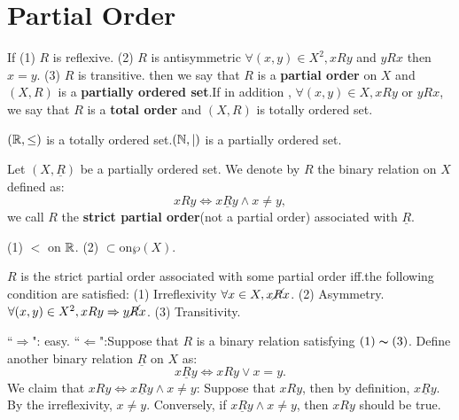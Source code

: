 \section{Partial Order}
\begin{definitionenv}
    If 
    \newline
    (1) $R$ is reflexive.
    \newline
    (2) $R$ is antisymmetric $\forall (x, y)\in X^2, xRy $ and $yRx$ then $x=y$.
    \newline
    (3) $R$ is transitive.
    \newline
    then we say that $R$ is a \textbf{partial order} on $X$ and $(X, R) $ is a \textbf{partially ordered set}.If in addition , $\forall (x, y)\in X , xRy$ or $yRx$,  we say that $R$ is a \textbf{total order} and $(X, R)$ is totally ordered set. 
\end{definitionenv}
\begin{exampleenv}
    $(\mathbb{R} , \le)$ is a totally ordered set.$(\mathbb{N} , |)$ is a partially ordered set.  
\end{exampleenv}
\begin{definitionenv}
    Let $(X, \underline{R})$ be a partially ordered set. We denote by $R$ the binary relation on $X$ defined as:$$xRy \Leftrightarrow x\underline{R}y \wedge x\not=y, $$ we call $R$ the \textbf{strict partial order}(not a partial order) associated with $\underline{R}$.
\end{definitionenv}
\begin{exampleenv}
    \quad
    \newline
    (1) $<$ on $\mathbb{R}$.
    \newline
    (2) $\subset $on$ \wp (X)$.
\end{exampleenv}
\begin{propositionenv}
    $R$ is the strict partial order associated with some partial order iff.the following condition are satisfied:
    \newline
    (1) Irreflexivity $\forall x\in X, x \cancel{R}x$.
    \newline
    (2) Asymmetry.$\forall (x, y)\in X^2, xRy\Rightarrow y\cancel{R}x$.
    \newline
    (3) Transitivity.
\end{propositionenv}
\begin{proofenv}
    ``$\Rightarrow$": easy.
    \newline
    ``$\Leftarrow$":Suppose that $R$ is a binary relation satisfying $(1)\thicksim(3)$. Define another binary relation $\underline{R}$ on $X$ as:
    $$x\underline{R}y\Leftrightarrow xRy \vee x=y.$$
    We claim that $xRy\Leftrightarrow x\underline{R}y \wedge x\not= y$:
    \newline
    Suppose that $xRy$,  then by definition,  $x\underline{R}y$. By the irreflexivity,  $x\not=y$.
    \newline
    Conversely,  if $x\underline{R}y\wedge x\not=y$, then $xRy$ should be true.
\end{proofenv}
